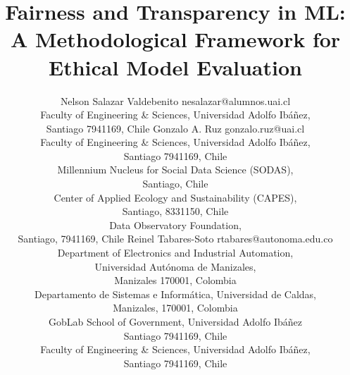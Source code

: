 \documentclass[twoside,11pt]{article}
\begin{document}
\title{Fairness and Transparency in ML: A Methodological Framework for Ethical Model Evaluation}

\author{\name Nelson Salazar Valdebenito \email nesalazar@alumnos.uai.cl \\
        \addr Faculty of Engineering \& Sciences, Universidad Adolfo Ibáñez,\\
        Santiago 7941169, Chile
        \AND 
       \name Gonzalo A. Ruz \email gonzalo.ruz@uai.cl \\
       \addr Faculty of Engineering \& Sciences, Universidad Adolfo Ibáñez,\\
        Santiago 7941169, Chile\\
        \addr Millennium Nucleus for Social Data Science (SODAS),\\ 
        Santiago, Chile\\
        \addr Center of Applied Ecology and Sustainability (CAPES), \\ 
        Santiago, 8331150, Chile\\
        \addr Data Observatory Foundation,\\
        Santiago, 7941169, Chile
       \AND
       \name Reinel Tabares-Soto \email  rtabares@autonoma.edu.co \\
       \addr Department of Electronics and Industrial Automation,\\ Universidad Autónoma de Manizales,\\ Manizales 170001, Colombia\\
       \addr Departamento de Sistemas e Informática, Universidad de Caldas, \\
       Manizales, 170001, Colombia \\
       \addr GobLab School of Government, Universidad Adolfo Ibáñez\\
       Santiago 7941169, Chile\\
       \addr Faculty of Engineering \& Sciences, Universidad Adolfo Ibáñez,\\
        Santiago 7941169, Chile\\}
       


\maketitle
\end{document}
